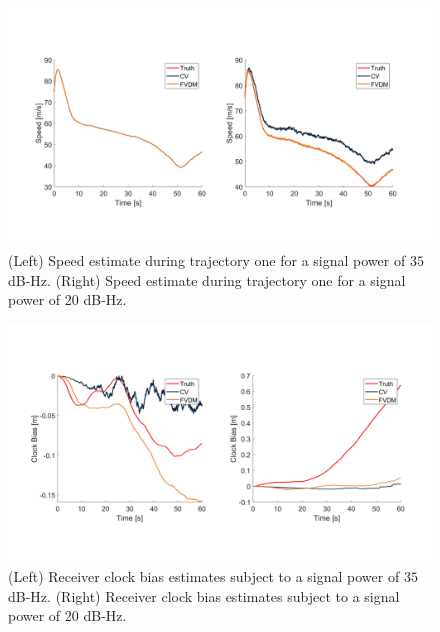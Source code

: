 \begin{figure}[!ht]
    \centering
    \includegraphics[width=\linewidth]{Figures/resultsv2/Slide6.PNG}
    \caption{(Left) Speed estimate during trajectory one for a signal power of \(35\) dB-Hz. (Right) Speed estimate during trajectory one for a signal power of \(20\) dB-Hz.}\label{fig:clockerror221}
\end{figure}

\begin{figure}[!ht]
    \centering
    \includegraphics[width=\linewidth]{Figures/resultsv2/Slide7.PNG}
    \caption{(Left) Receiver clock bias estimates subject to a signal power of \(35\) dB-Hz. (Right) Receiver clock bias estimates subject to a signal power of \(20\) dB-Hz.}\label{fig:fixthis}
\end{figure}

